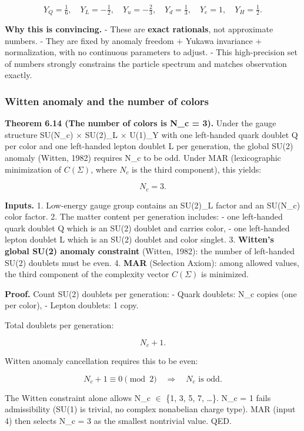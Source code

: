\documentclass[11pt,a4paper]{article}
\theoremstyle{remark}
\begin{document}
\[
Y_Q = \tfrac{1}{6}, \quad
Y_L = -\tfrac{1}{2}, \quad
Y_u = -\tfrac{2}{3}, \quad
Y_d = \tfrac{1}{3}, \quad
Y_e = 1, \quad
Y_H = \tfrac{1}{2}.
\]

\textbf{Why this is convincing.}
- These are \textbf{exact rationals}, not approximate numbers.
- They are fixed by anomaly freedom + Yukawa invariance + normalization,
with no continuous parameters to adjust.
- This high-precision set of numbers strongly constrains the particle
spectrum and matches observation exactly.

\subsubsection{Witten anomaly and the number of colors}\label{witten-anomaly-and-the-number-of-colors}

\textbf{Theorem 6.14 (The number of colors is N\_c = 3).}
Under the gauge structure SU(N\_c) \ensuremath{\times} SU(2)\_L \ensuremath{\times} U(1)\_Y with one
left-handed quark doublet Q per color and one left-handed lepton doublet
L per generation, the global SU(2) anomaly (Witten, 1982) requires
N\_c to be odd. Under MAR (lexicographic minimization of \(C(\Sigma)\),
where \(N_c\) is the third component), this yields:

\[
N_c = 3.
\]

\textbf{Inputs.}
1. Low-energy gauge group contains an SU(2)\_L factor and an SU(N\_c)
color factor.
2. The matter content per generation includes:
- one left-handed quark doublet Q which is an SU(2) doublet and
carries color,
- one left-handed lepton doublet L which is an SU(2) doublet and
color singlet.
3. \textbf{Witten's global SU(2) anomaly constraint} (Witten, 1982): the
number of left-handed SU(2) doublets must be even.
4. \textbf{MAR} (Selection Axiom): among allowed values, the third component
of the complexity vector \(C(\Sigma)\) is minimized.

\textbf{Proof.} Count SU(2) doublets per generation:
- Quark doublets: N\_c copies (one per color),
- Lepton doublets: 1 copy.

Total doublets per generation:

\[
N_c + 1.
\]

Witten anomaly cancellation requires this to be even:

\[
N_c + 1 \equiv 0 \pmod{2} \quad \Rightarrow \quad N_c \text{ is odd}.
\]

The Witten constraint alone allows N\_c \ensuremath{\in} \{1, 3, 5, 7, \ldots\}. N\_c = 1
fails admissibility (SU(1) is trivial, no complex nonabelian charge type).
MAR (input 4) then selects N\_c = 3 as the smallest nontrivial value. QED.
\end{document}
